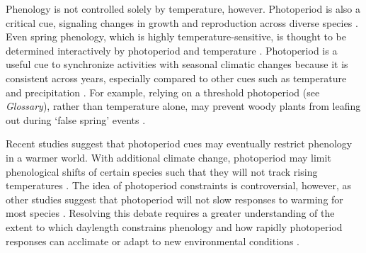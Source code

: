 \documentclass{article}
\begin{document}
\par Phenology is not controlled solely by temperature, however. Photoperiod is also a critical cue, signaling changes in growth and reproduction across diverse species \citep[e.g.,][]{flynn2018,lagercrantz2009,bradshaw2007,Howe:1996,solbakken1994}. Even spring phenology, which is highly temperature-sensitive, is thought to be determined interactively by photoperiod and temperature \citep[][see also Box 1]{fu2019}. Photoperiod is a useful cue to synchronize activities with seasonal climatic changes \citep[e.g.,][]{Singh:2017, Basler:2012, Hsu:2011} because it is consistent across years, especially compared to other cues such as temperature and precipitation \citep{saikkonen2012}.  For example, relying on a threshold photoperiod (see \emph{Glossary}), rather than temperature alone, may prevent woody plants from leafing out during `false spring' events \citep[unusually warm periods during winter and early spring that are followed by a return to cold temperatures,][]{gu2008}. %

\par Recent studies suggest that photoperiod cues may eventually restrict phenology in a warmer world. With additional climate change, photoperiod may limit phenological shifts of certain species such that they will not track rising temperatures \citep{fu2015,way2015,Basler:2012,koerner2010a}. The idea of photoperiod constraints is controversial, however, as other studies suggest that photoperiod will not slow responses to warming for most species \citep{chuine2010,zohner2016}. Resolving this debate requires a greater understanding of the extent to which daylength constrains phenology and how rapidly photoperiod responses can acclimate or adapt to new environmental conditions \citep{grevstad2015}.
\end{document}
